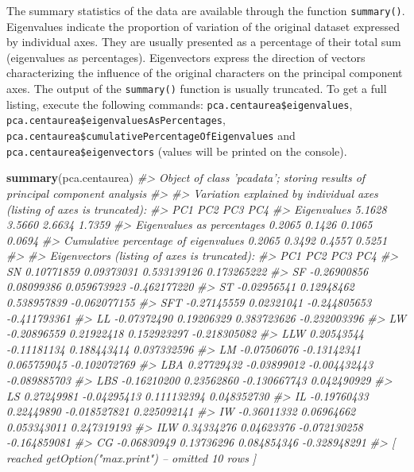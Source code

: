 \documentclass[
]{article}
\newenvironment{Shaded}{\begin{snugshade}}{\end{snugshade}}
\newcommand{\CommentTok}[1]{\textcolor[rgb]{0.56,0.35,0.01}{\textit{#1}}}
\newcommand{\KeywordTok}[1]{\textcolor[rgb]{0.13,0.29,0.53}{\textbf{#1}}}
\newcommand{\NormalTok}[1]{#1}
\begin{document}
The summary statistics of the data are available through the function
\texttt{summary()}. Eigenvalues indicate the proportion of variation of
the original dataset expressed by individual axes. They are usually
presented as a percentage of their total sum (eigenvalues as
percentages). Eigenvectors express the direction of vectors
characterizing the influence of the original characters on the principal
component axes. The output of the \texttt{summary()} function is usually
truncated. To get a full listing, execute the following commands:
\texttt{pca.centaurea\$eigenvalues},
\texttt{pca.centaurea\$eigenvaluesAsPercentages},
\texttt{pca.centaurea\$cumulativePercentageOfEigenvalues} and
\texttt{pca.centaurea\$eigenvectors} (values will be printed on the
console).

\begin{Shaded}
\begin{Highlighting}[]
\KeywordTok{summary}\NormalTok{(pca.centaurea)}
\CommentTok{#> Object of class 'pcadata'; storing results of principal component analysis}
\CommentTok{#> }
\CommentTok{#> Variation explained by individual axes (listing of axes is truncated):}
\CommentTok{#>                                         PC1    PC2    PC3    PC4}
\CommentTok{#> Eigenvalues                          5.1628 3.5660 2.6634 1.7359}
\CommentTok{#> Eigenvalues as percentages           0.2065 0.1426 0.1065 0.0694}
\CommentTok{#> Cumulative percentage of eigenvalues 0.2065 0.3492 0.4557 0.5251}
\CommentTok{#> }
\CommentTok{#> Eigenvectors (listing of axes is truncated):}
\CommentTok{#>             PC1         PC2          PC3          PC4}
\CommentTok{#> SN   0.10771859  0.09373031  0.533139126  0.173265222}
\CommentTok{#> SF  -0.26900856  0.08099386  0.059673923 -0.462177220}
\CommentTok{#> ST  -0.02956541  0.12948462  0.538957839 -0.062077155}
\CommentTok{#> SFT -0.27145559  0.02321041 -0.244805653 -0.411793361}
\CommentTok{#> LL  -0.07372490  0.19206329  0.383723626 -0.232003396}
\CommentTok{#> LW  -0.20896559  0.21922418  0.152923297 -0.218305082}
\CommentTok{#> LLW  0.20543544 -0.11181134  0.188443414  0.037332596}
\CommentTok{#> LM  -0.07506076 -0.13142341  0.065759045 -0.102072769}
\CommentTok{#> LBA  0.27729432 -0.03899012 -0.004432443 -0.089885703}
\CommentTok{#> LBS -0.16210200  0.23562860 -0.130667743  0.042490929}
\CommentTok{#> LS   0.27249981 -0.04295413  0.111132394  0.048352730}
\CommentTok{#> IL  -0.19760433  0.22449890 -0.018527821  0.225092141}
\CommentTok{#> IW  -0.36011332  0.06964662  0.053343011  0.247319193}
\CommentTok{#> ILW  0.34334276  0.04623376 -0.072130258 -0.164859081}
\CommentTok{#> CG  -0.06830949  0.13736296  0.084854346 -0.328948291}
\CommentTok{#>  [ reached getOption("max.print") -- omitted 10 rows ]}
\end{Highlighting}
\end{Shaded}
\end{document}
